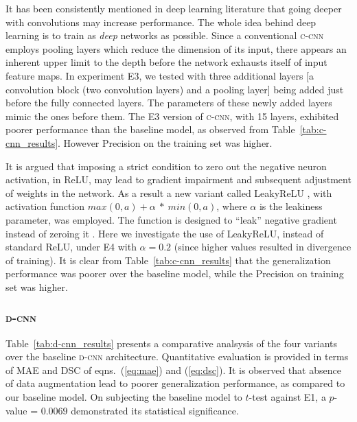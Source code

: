 \documentclass[journal,twocolumn]{IEEEtran}
\begin{document}
It has been consistently mentioned in deep learning literature that going deeper with convolutions may increase performance. The whole idea behind deep learning is to train as \textit{deep} networks as possible. Since a
conventional {\scshape{c-cnn}} employs pooling layers which reduce the dimension of its input, there appears an inherent upper limit to the depth  before the network exhausts itself of  input feature maps. In  experiment E3, we tested with three additional layers [a convolution block (two convolution layers) and a pooling layer] being  added just before the fully connected layers. The parameters of these  newly added   layers mimic the ones before them. The E3 version of {\scshape{c-cnn}},  with 15 layers, exhibited  poorer performance than the baseline model,   as observed from Table~\ref{tab:c-cnn_results}. However Precision on the training set was higher.

It is argued that imposing a strict condition to zero out the negative neuron activation, in ReLU,  may lead to gradient impairment and subsequent  adjustment of weights in the network. As a result a new variant called LeakyReLU \cite{Maas2013_lrelu},  with activation function $max(0,a) + \alpha~*~ min(0,a)$, where $\alpha$ is the leakiness parameter, was employed. The  function is designed to ``leak'' negative gradient instead of zeroing it \cite{Pereira2016}. Here we investigate the use of LeakyReLU, instead of standard ReLU, under E4  with $\alpha = 0.2$ (since higher values resulted in divergence of training). It is clear from Table~\ref{tab:c-cnn_results} that the generalization performance was poorer over the baseline model, while the Precision on training set was higher.

\subsubsection{{\scshape{d-cnn}}} Table~\ref{tab:d-cnn_results} presents a comparative analsysis of the four variants over the baseline {\scshape{d-cnn}}  architecture. Quantitative evaluation is provided in terms of MAE and DSC of eqns.~(\ref{eq:mae}) and (\ref{eq:dsc}). It is observed that absence of data augmentation lead to poorer generalization performance, as compared to our baseline model. On subjecting the baseline model  to $t$-test against  E1, a $p$-value = $0.0069$ demonstrated its  statistical significance.
\end{document}
